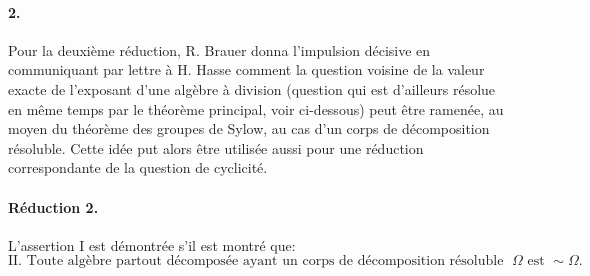 \paragraph{2.}
Pour la deuxième réduction, R. Brauer donna l'impulsion décisive en communiquant par lettre à H. Hasse comment la question voisine de la valeur exacte de l'exposant d'une algèbre à division (question qui est d'ailleurs résolue en même temps par le théorème principal, voir ci-dessous) peut être ramenée, au moyen du théorème des groupes de Sylow, au cas d'un corps de décomposition résoluble. Cette idée put alors être utilisée aussi pour une réduction correspondante de la question de cyclicité.

\paragraph{Réduction 2.}
L'assertion I est démontrée s'il est montré que:
\[
\text{II. Toute algèbre partout décomposée ayant un corps de décomposition résoluble sur }\Omega\text{ est }\sim\Omega .
\]

